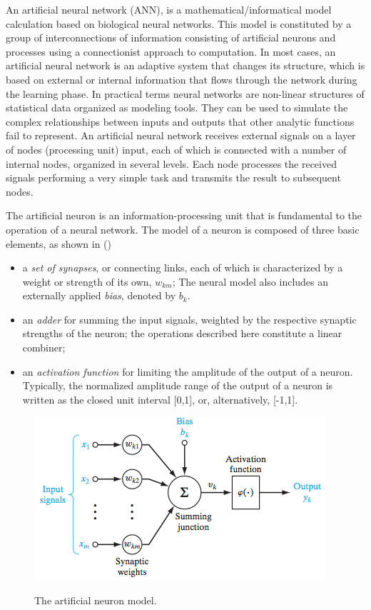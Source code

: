 An artificial neural network (ANN), is a mathematical/informatical model calculation based on biological neural networks.
This model is constituted by a group of interconnections of information consisting of artificial neurons and processes using a connectionist approach to computation. In most cases, an artificial neural network is an adaptive system that changes its structure, which is based on external or internal information that flows through the network during the learning phase. 
In practical terms neural networks are non-linear structures of statistical data organized as modeling tools.
They can be used to simulate the complex relationships between inputs and outputs that other analytic functions fail to represent.
An artificial neural network receives external signals on a layer of nodes (processing unit) input, each of which is connected with a number of internal nodes, organized in several levels. Each node processes the received signals performing a very simple task  and transmits the result to subsequent nodes. 

The artificial neuron is an information-processing unit that is fundamental to the operation of a neural network. The model of a neuron is composed of three basic elements, as shown in () 

\begin{itemize}
\item a \textit{set of synapses}, or connecting links, each of which is characterized by a weight or strength of its own, $w_{km}$; The neural model also includes an externally applied \textit{bias}, denoted by $b_k$.
\item an \textit{adder} for summing the input signals, weighted by the respective synaptic strengths of the neuron; the operations described here constitute a linear combiner;
\item an \textit{activation function} for limiting the amplitude of the output of a neuron. Typically, the normalized amplitude range of the output of a neuron is written as the closed unit interval [0,1], or, alternatively, [-1,1].
\end{itemize}


\begin{figure}[h]
\centering
\caption{The artificial neuron model.}
\includegraphics[width=0.8\linewidth]{img/NeuronModel.jpg}
\label{fig:artificial_neuron}
\end{figure}

